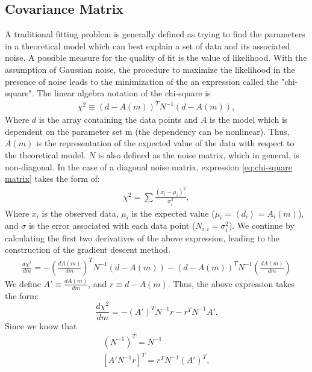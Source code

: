 \documentclass[12pt, TexShade, letterpaper]{report}
\begin{document}
\subsection{Covariance Matrix}
\label{chap:method,sub:cov_mat}
A traditional fitting problem is generally defined as trying to find the parameters in a theoretical model which can best explain a set of data and its associated noise. A possible measure for the quality of fit is the value of likelihood. With the assumption of Gaussian noise, the procedure to maximize the likelihood in the presence of noise leads to the minimization of the 
an expression called the "chi-square". The linear algebra notation of the chi-square is
\begin{gather}
    \chi^2 \equiv \left (d-A\left(m\right)\right)^T N^{-1} \left(d-A\left(m\right)\right),
    \label{eq:chi-square matrix}
\end{gather}
Where $d$ is the array containing the data points and $A$ is the model which is dependent on the parameter set m (the dependency can be nonlinear). Thus, $A(m)$ is the representation of the expected value of the data with respect to the theoretical model. $N$ is also defined as the noise matrix, which in general, is non-diagonal. In the case of a diagonal noise matrix, expression \ref{eq:chi-square matrix} takes the form of:
\begin{gather}
    \chi^2 = \sum \frac {\left(x_i - \mu_i\right)^2}{\sigma^2_{i}},
    \label{eq: chi-sqaure simple}
\end{gather}
Where $x_i$ is the observed data, $\mu_i$ is the expected value ($\mu_i=\left<d_i\right>=A_i\left(m\right)$), and $\sigma$ is the error associated with each data point ($N_{i, i} = \sigma^2_{i}$). We continue by calculating the first two derivatives of the above expression, leading to the construction of the gradient descent method.
\begin{gather}
        \frac{d \chi^2}{dm} = - \left(\frac{dA\left(m\right)}{dm}\right)^T N^{-1} (d-A(m)) - \left(d-A\left(m\right)\right)^T N^{-1} \left(\frac{dA(m)}{dm}\right ) 
\end{gather}
We define $A' \equiv\frac{dA(m)}{dm}$, and $r \equiv d - A(m)$. Thus, the above expression takes the form:
\begin{equation}
    \frac{d \chi^2}{dm} = - \left(A'\right)^T N^{-1} r - r^T N^{-1} A'.
    \label{eq:csq_first_deriv}
\end{equation}
Since we know that 
\begin{gather}
    \left(N^{-1}\right)^T = N^{-1}\\
    \left[A' N^{-1} r\right]^T = r^T N^{-1} \left(A'\right)^T,
\end{gather}
\end{document}
